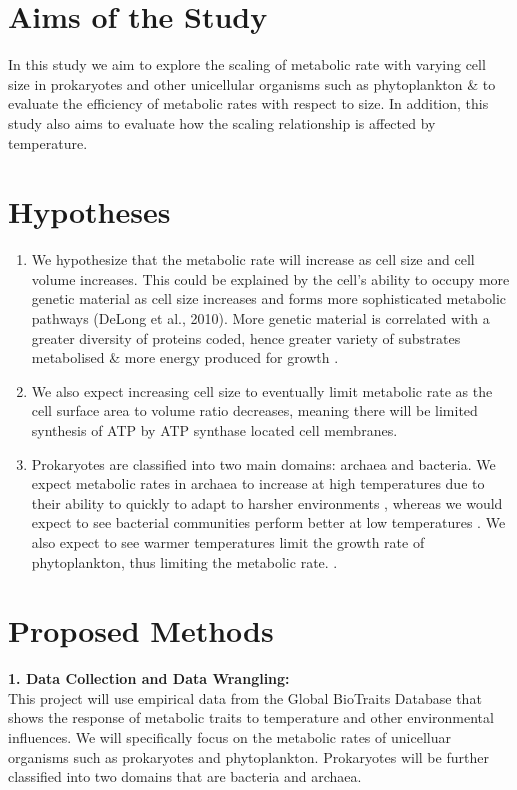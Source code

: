 \documentclass[11pt]{report}
\begin{document}
\section*{Aims of the Study}
In this study we aim to explore the scaling of metabolic rate with varying cell size in prokaryotes and other unicellular organisms such as phytoplankton \& to evaluate the efficiency of metabolic rates with respect to size. In addition, this study also aims to evaluate how the scaling relationship is affected by temperature.

\section*{Hypotheses}
\begin{enumerate}[label=(\roman*)]
\item We hypothesize that the metabolic rate will increase as cell size and cell volume increases. This could be explained by the cell's ability to occupy more genetic material as cell size increases and forms more sophisticated metabolic pathways (DeLong et al., 2010). More genetic material is correlated with a greater diversity of proteins coded, hence greater variety of substrates metabolised \& more energy produced for growth \citep{DeLong2010}.

\item We also expect increasing cell size to eventually limit metabolic rate as the cell surface area to volume ratio decreases, meaning there will be limited synthesis of ATP by ATP synthase located cell membranes.

\item Prokaryotes are classified into two main domains: archaea and bacteria. We expect metabolic rates in archaea to increase at high temperatures due to their ability to quickly to adapt to harsher environments \citep{Rampelotto2013}, whereas we would expect to see bacterial communities perform better at low temperatures \citep{Li2015}. We also expect to see warmer temperatures limit the growth rate of phytoplankton, thus limiting the metabolic rate. \citep{Rasconi2017}.
\end{enumerate}

\section*{Proposed Methods}
\textbf{1. Data Collection and Data Wrangling:}
\\
This project will use empirical data from the Global BioTraits Database \citep{Dell2013} that shows the response of metabolic traits to temperature and other environmental influences. We will specifically focus on the metabolic rates of unicelluar organisms such as prokaryotes and phytoplankton. Prokaryotes will be further classified into two domains that are bacteria and archaea.
\end{document}

